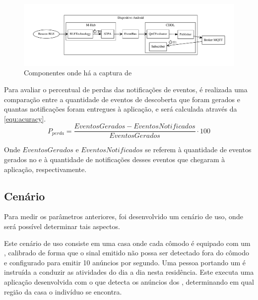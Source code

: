 \begin{figure}[htb]
	
	\begin{center}

		\caption{\label{img:performance-annotation}Componentes onde há a captura de \timestamps}
		\includegraphics[width=0.95\linewidth]{img/performance-annotation}
		\fonte{\autoriapropria}

	\end{center}
	
\end{figure}

Para avaliar o percentual de perdas das notificações de eventos, é realizada uma comparação entre a quantidade de eventos de descoberta \smartobjs que foram gerados e quantas notificações foram entregues à aplicação, e será calculada através da \autoref{equ:acuracy}.
\begin{equation}
	\label{equ:acuracy}
	P_{perda} = \frac{EventosGerados - EventosNotificados}{EventosGerados} \cdot 100
\end{equation}

Onde $EventosGerados$ e $EventosNotificados$ se referem à quantidade de eventos gerados no \stwopa e à quantidade de notificações desses eventos que chegaram à aplicação, respectivamente.


\subsection{Cenário}\label{sub:cenario}
Para medir os parâmetros anteriores, foi desenvolvido um cenário de uso, onde será possível determinar tais aspectos.

Este cenário de uso consiste em uma casa onde cada cômodo é equipado com um \beacon \ble, calibrado de forma que o sinal emitido não possa ser detectado fora do cômodo e configurado para emitir 10 anúncios por segundo.
Uma pessoa portando um \smartphone é instruída a conduzir as atividades do dia a dia nesta residência.
Este \smartphone executa uma aplicação desenvolvida com o \middleware \mhubcddl que detecta os anúncios dos \beacons, determinando em qual região da casa o indivíduo se encontra.

